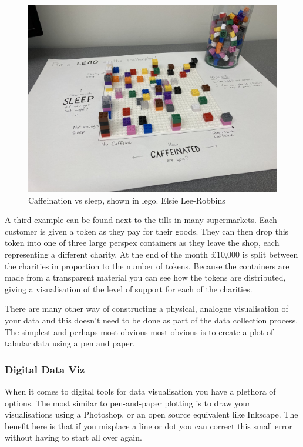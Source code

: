\documentclass[
  letterpaper,
  DIV=11,
  numbers=noendperiod]{scrreprt}
\begin{document}
\begin{figure}[H]

{\centering \includegraphics[width=1\textwidth,height=\textheight]{images/303-data-visualisation/lego-coffee.jpg}

}

\caption{Caffeination vs sleep, shown in lego. Elsie Lee-Robbins}

\end{figure}%

A third example can be found next to the tills in many supermarkets.
Each customer is given a token as they pay for their goods. They can
then drop this token into one of three large perspex containers as they
leave the shop, each representing a different charity. At the end of the
month £10,000 is split between the charities in proportion to the number
of tokens. Because the containers are made from a transparent material
you can see how the tokens are distributed, giving a visualisation of
the level of support for each of the charities.

There are many other way of constructing a physical, analogue
visualisation of your data and this doesn't need to be done as part of
the data collection process. The simplest and perhaps most obvious most
obvious is to create a plot of tabular data using a pen and paper.

\subsubsection{Digital Data Viz}\label{digital-data-viz}

When it comes to digital tools for data visualisation you have a
plethora of options. The most similar to pen-and-paper plotting is to
draw your visualisations using a Photoshop, or an open source equivalent
like Inkscape. The benefit here is that if you misplace a line or dot
you can correct this small error without having to start all over again.
\end{document}
